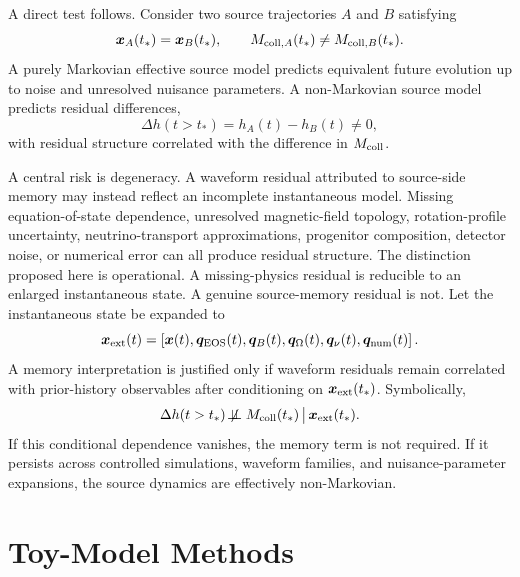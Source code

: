 \documentclass[11pt]{article}
\begin{document}
A direct test follows. Consider two source trajectories \(A\) and \(B\) satisfying
\begin{equation}
\bm{x}_A(t_\ast)=\bm{x}_B(t_\ast),
\qquad
M_{{\rm coll},A}(t_\ast)\neq M_{{\rm coll},B}(t_\ast).
\end{equation}
A purely Markovian effective source model predicts equivalent future evolution up to noise and unresolved nuisance parameters. A non-Markovian source model predicts residual differences,
\begin{equation}
\Delta h(t>t_\ast)=h_A(t)-h_B(t)\neq0,
\end{equation}
with residual structure correlated with the difference in \(M_{\rm coll}\).

A central risk is degeneracy. A waveform residual attributed to source-side memory may instead reflect an incomplete instantaneous model. Missing equation-of-state dependence, unresolved magnetic-field topology, rotation-profile uncertainty, neutrino-transport approximations, progenitor composition, detector noise, or numerical error can all produce residual structure. The distinction proposed here is operational. A missing-physics residual is reducible to an enlarged instantaneous state. A genuine source-memory residual is not. Let the instantaneous state be expanded to
\begin{equation}
\bm{x}_{\rm ext}(t)=\left[\bm{x}(t),\bm{q}_{\rm EOS}(t),\bm{q}_{B}(t),\bm{q}_{\Omega}(t),\bm{q}_{\nu}(t),\bm{q}_{\rm num}(t)\right].
\end{equation}
A memory interpretation is justified only if waveform residuals remain correlated with prior-history observables after conditioning on \(\bm{x}_{\rm ext}(t_\ast)\). Symbolically,
\begin{equation}
\Delta h(t>t_\ast)\not\!\perp\!\!\!\perp M_{\rm coll}(t_\ast)\,\big|\,\bm{x}_{\rm ext}(t_\ast).
\end{equation}
If this conditional dependence vanishes, the memory term is not required. If it persists across controlled simulations, waveform families, and nuisance-parameter expansions, the source dynamics are effectively non-Markovian.

\section{Toy-Model Methods}
\label{sec:toy_methods}
\end{document}
